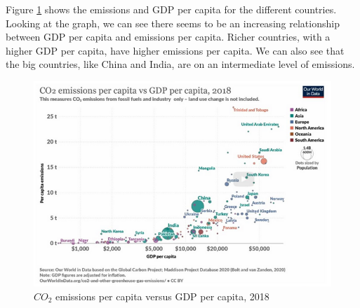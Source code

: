 \documentclass[../summary.tex]{subfiles}
\begin{document}
	Figure \ref{fig:emissions-and-GDP-per-capita} shows the emissions and GDP per capita for the different countries. Looking at the graph, we can see there seems to be an increasing relationship between GDP per capita and emissions per capita. Richer countries, with a higher GDP per capita, have higher emissions per capita. We can also see that the big countries, like China and India, are on an intermediate level of emissions. 
	
	\begin{figure}
		\centering
		\includegraphics[width=1\linewidth]{images/10-emissions-and-GDP-per-capita.png}
		\caption{$CO_{2}$ emissions per capita versus GDP per capita, 2018}
		\label{fig:emissions-and-GDP-per-capita}
		
	\end{figure}
	
	
	
	
\end{document}
